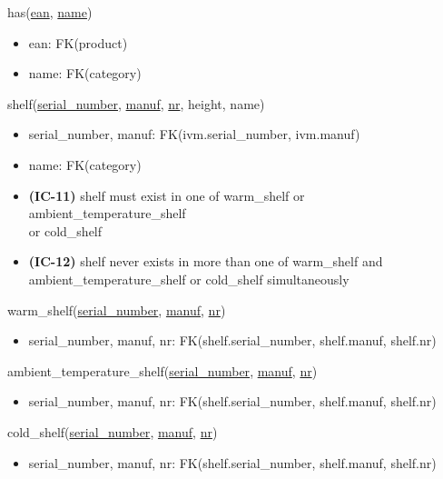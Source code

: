 \documentclass[12pt,a4paper]{article}
\begin{document}
  \vspace*{10pt}

  \noindent
  has(\underline{ean}, \underline{name})
  \begin{itemize}[nosep]
    \item ean: FK(product)
    \item name: FK(category)
  \end{itemize}


  \vspace*{10pt}

  \noindent
  shelf(\underline{serial\_number}, \underline{manuf}, \underline{nr}, height, name)
  \begin{itemize}[nosep]
    \item serial\_number, manuf: FK(ivm.serial\_number, ivm.manuf)
    \item name: FK(category)
    \item \textsf{\textbf{(IC-11)}} shelf \textsf{must exist in one of} warm\_shelf \textsf{or} ambient\_temperature\_shelf\\ \textsf{or} cold\_shelf
    \item \textsf{\textbf{(IC-12)}} shelf \textsf{never exists in more than one of} warm\_shelf \textsf{and}\\ ambient\_temperature\_shelf \textsf{or} cold\_shelf \textsf{simultaneously}
  \end{itemize}

  \vspace*{10pt}

  \noindent
  warm\_shelf(\underline{serial\_number}, \underline{manuf}, \underline{nr})
  \begin{itemize}[nosep]
    \item serial\_number, manuf, nr: FK(shelf.serial\_number, shelf.manuf, shelf.nr)
  \end{itemize}

  \vspace*{10pt}

  \noindent
  ambient\_temperature\_shelf(\underline{serial\_number}, \underline{manuf}, \underline{nr})
  \begin{itemize}[nosep]
    \item serial\_number, manuf, nr: FK(shelf.serial\_number, shelf.manuf, shelf.nr)
  \end{itemize}

  \vspace*{10pt}

  \noindent
  cold\_shelf(\underline{serial\_number}, \underline{manuf}, \underline{nr})
  \begin{itemize}[nosep]
    \item serial\_number, manuf, nr: FK(shelf.serial\_number, shelf.manuf, shelf.nr)
  \end{itemize}
\end{document}
